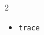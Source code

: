\documentclass[10pt]{article}
\begin{document}
\begin{multicols}{2}
\begin{scriptsize}
\begin{itemize}
    \item \texttt{trace}
\end{itemize}
\end{scriptsize}

\end{multicols}
\end{document}
